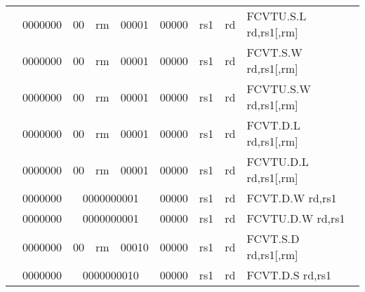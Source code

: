 \begin{table}[p]
\begin{small}
\begin{center}
\begin{tabular}{rcccccccccl}
&
\multicolumn{1}{|c|}{0000000} &
\multicolumn{1}{c|}{00} &
\multicolumn{2}{c|}{rm} &
\multicolumn{2}{c|}{00001} &
\multicolumn{1}{c|}{00000} &
\multicolumn{1}{c|}{rs1} &
\multicolumn{1}{c|}{rd} & FCVTU.S.L rd,rs1[,rm] \\
\cline{2-10}
  

&
\multicolumn{1}{|c|}{0000000} &
\multicolumn{1}{c|}{00} &
\multicolumn{2}{c|}{rm} &
\multicolumn{2}{c|}{00001} &
\multicolumn{1}{c|}{00000} &
\multicolumn{1}{c|}{rs1} &
\multicolumn{1}{c|}{rd} & FCVT.S.W rd,rs1[,rm] \\
\cline{2-10}
  

&
\multicolumn{1}{|c|}{0000000} &
\multicolumn{1}{c|}{00} &
\multicolumn{2}{c|}{rm} &
\multicolumn{2}{c|}{00001} &
\multicolumn{1}{c|}{00000} &
\multicolumn{1}{c|}{rs1} &
\multicolumn{1}{c|}{rd} & FCVTU.S.W rd,rs1[,rm] \\
\cline{2-10}
  

&
\multicolumn{1}{|c|}{0000000} &
\multicolumn{1}{c|}{00} &
\multicolumn{2}{c|}{rm} &
\multicolumn{2}{c|}{00001} &
\multicolumn{1}{c|}{00000} &
\multicolumn{1}{c|}{rs1} &
\multicolumn{1}{c|}{rd} & FCVT.D.L rd,rs1[,rm] \\
\cline{2-10}
  

&
\multicolumn{1}{|c|}{0000000} &
\multicolumn{1}{c|}{00} &
\multicolumn{2}{c|}{rm} &
\multicolumn{2}{c|}{00001} &
\multicolumn{1}{c|}{00000} &
\multicolumn{1}{c|}{rs1} &
\multicolumn{1}{c|}{rd} & FCVTU.D.L rd,rs1[,rm] \\
\cline{2-10}
  

&
\multicolumn{1}{|c|}{0000000} &
\multicolumn{5}{c|}{0000000001} &
\multicolumn{1}{c|}{00000} &
\multicolumn{1}{c|}{rs1} &
\multicolumn{1}{c|}{rd} & FCVT.D.W rd,rs1 \\
\cline{2-10}
  

&
\multicolumn{1}{|c|}{0000000} &
\multicolumn{5}{c|}{0000000001} &
\multicolumn{1}{c|}{00000} &
\multicolumn{1}{c|}{rs1} &
\multicolumn{1}{c|}{rd} & FCVTU.D.W rd,rs1 \\
\cline{2-10}
  

&
\multicolumn{1}{|c|}{0000000} &
\multicolumn{1}{c|}{00} &
\multicolumn{2}{c|}{rm} &
\multicolumn{2}{c|}{00010} &
\multicolumn{1}{c|}{00000} &
\multicolumn{1}{c|}{rs1} &
\multicolumn{1}{c|}{rd} & FCVT.S.D rd,rs1[,rm] \\
\cline{2-10}
  

&
\multicolumn{1}{|c|}{0000000} &
\multicolumn{5}{c|}{0000000010} &
\multicolumn{1}{c|}{00000} &
\multicolumn{1}{c|}{rs1} &
\multicolumn{1}{c|}{rd} & FCVT.D.S rd,rs1 \\
\cline{2-10}
  


\end{tabular}
\end{center}
\end{small}
\end{table}
